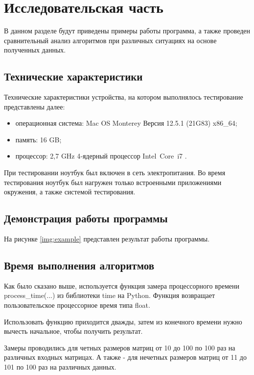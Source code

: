 \chapter{Исследовательская часть}

В данном разделе будут приведены примеры работы программа, а также проведен сравнительный анализ алгоритмов при различных ситуациях на основе полученных данных.

\section{Технические характеристики}

Технические характеристики устройства, на котором выполнялось тестирование представлены далее:

\begin{itemize}
	\item операционная система: Mac OS Monterey Версия 12.5.1 (21G83) \cite{macos} x86\_64;
	\item память: 16 GB;
	\item процессор: 2,7 GHz 4‑ядерный процессор Intel Core i7 \cite{intel}.
\end{itemize}

При тестировании ноутбук был включен в сеть электропитания. Во время тестирования ноутбук был нагружен только встроенными приложениями окружения, а также системой тестирования.

\section{Демонстрация работы программы}

На рисунке \ref{img:example} представлен результат работы программы.

\clearpage

\section{Время выполнения алгоритмов}

Как было сказано выше, используется функция замера процессорного времени process\_time(...) из библиотеки time на Python. Функция возвращает пользовательское процессорное время типа float.

Использовать функцию приходится дважды, затем из конечного времени нужно вычесть начальное, чтобы получить результат.

Замеры проводились для четных размеров матриц от 10 до 100 по 100 раз на различных входных матрицах. А также - для нечетных размеров матриц от 11 до 101 по 100 раз на различных данных.

